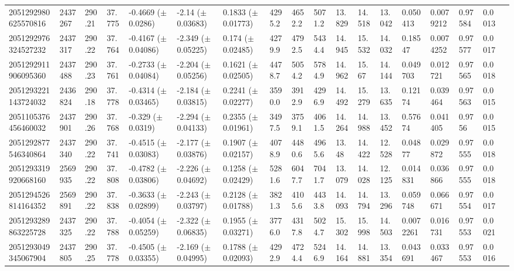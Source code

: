 \begin{sidewaystable}[htbp]
{\begin{tabular}{llllllllllllllllll}
            2051292980625570816 & 2437267 & 290.21 & 37.775 & -0.4669 ($\pm$ 0.0286) & -2.14 ($\pm$ 0.03683) & 0.1833 ($\pm$ 0.01773) & 4295.2 & 4652.2 & 5071.2 & 13.829 & 14.518 & 13.042 & 0.050413 & 0.0079212 & 0.97584 & 0.0013 & \\
            2051292976324527232 & 2437317 & 290.22 & 37.764 & -0.4167 ($\pm$ 0.04086) & -2.349 ($\pm$ 0.05225) & 0.174 ($\pm$ 0.02485) & 4279.9 & 4792.5 & 5434.4 & 14.945 & 15.532 & 14.032 & 0.18547 & 0.0074252 & 0.97577 & 0.0017 & \\
            2051292911906095360 & 2437488 & 290.23 & 37.761 & -0.2733 ($\pm$ 0.04084) & -2.204 ($\pm$ 0.05256) & 0.1621 ($\pm$ 0.02505) & 4478.7 & 5054.2 & 5784.9 & 14.962 & 15.67 & 14.144 & 0.049703 & 0.012721 & 0.97565 & 0.0018 & \\
            2051293221143724032 & 2436824 & 290.18 & 37.778 & -0.4314 ($\pm$ 0.03465) & -2.184 ($\pm$ 0.03815) & 0.2241 ($\pm$ 0.02277) & 3590.0 & 3912.9 & 4296.9 & 14.492 & 15.279 & 13.635 & 0.12174 & 0.039464 & 0.97563 & 0.0015 & \\
            2051105376456460032 & 2437901 & 290.26 & 37.768 & -0.329 ($\pm$ 0.0319) & -2.294 ($\pm$ 0.04133) & 0.2355 ($\pm$ 0.01961) & 3497.5 & 3759.1 & 4061.5 & 14.264 & 14.988 & 13.452 & 0.57674 & 0.041405 & 0.9756 & 0.0015 & \\
            2051292877546340864 & 2437340 & 290.22 & 37.741 & -0.4515 ($\pm$ 0.03083) & -2.177 ($\pm$ 0.03876) & 0.1907 ($\pm$ 0.02157) & 4078.9 & 4480.6 & 4965.6 & 13.48 & 14.422 & 12.528 & 0.04877 & 0.029872 & 0.97555 & 0.0018 & \\
            2051293319920668160 & 2569935 & 290.22 & 37.808 & -0.4782 ($\pm$ 0.03806) & -2.226 ($\pm$ 0.04692) & 0.1258 ($\pm$ 0.02429) & 5281.6 & 6047.7 & 7041.7 & 13.079 & 14.028 & 12.125 & 0.014831 & 0.036866 & 0.97555 & 0.0018 & \\
            2051294526814164352 & 2569891 & 290.22 & 37.838 & -0.3633 ($\pm$ 0.02899) & -2.243 ($\pm$ 0.03797) & 0.2128 ($\pm$ 0.01788) & 3821.3 & 4105.6 & 4433.8 & 14.093 & 14.794 & 13.296 & 0.059748 & 0.066671 & 0.97554 & 0.0017 & \\
            2051293289863225728 & 2437325 & 290.22 & 37.788 & -0.4054 ($\pm$ 0.05259) & -2.322 ($\pm$ 0.06835) & 0.1955 ($\pm$ 0.03271) & 3776.0 & 4317.8 & 5024.7 & 15.302 & 15.998 & 14.503 & 0.0072261 & 0.016731 & 0.97553 & 0.0021 & \\
            2051293049345067904 & 2437805 & 290.25 & 37.778 & -0.4505 ($\pm$ 0.03355) & -2.169 ($\pm$ 0.04995) & 0.1788 ($\pm$ 0.02093) & 4292.9 & 4724.4 & 5246.9 & 14.164 & 14.881 & 13.354 & 0.043691 & 0.033467 & 0.97553 & 0.0016 & \\

\end{tabular}}
\end{sidewaystable}
